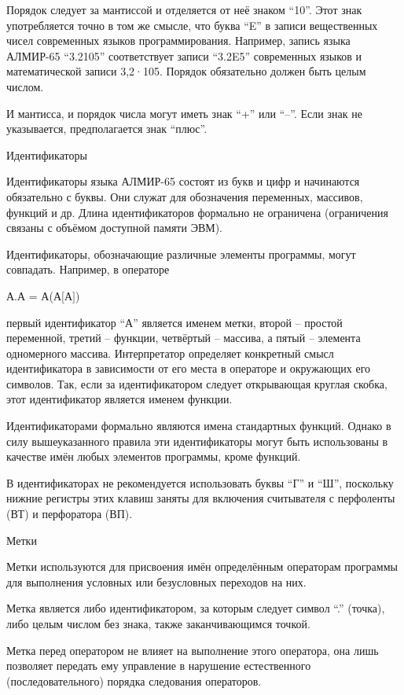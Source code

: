 \documentclass[11pt]{article}
\begin{document}
Порядок следует за мантиссой и
отделяется от неё знаком “10”. Этот
знак употребляется точно в том же
смысле, что буква “E” в записи
вещественных чисел современных языков
программирования. Например, запись
языка АЛМИР-65 “3.2105” соответствует
записи “3.2E5” современных языков и
математической записи 3,2·105. Порядок
обязательно должен быть целым числом.

И мантисса, и порядок числа могут иметь
знак “+” или “–”. Если знак не
указывается, предполагается знак
“плюс”.

Идентификаторы

Идентификаторы языка АЛМИР-65 состоят
из букв и цифр и начинаются обязательно
с буквы. Они служат для обозначения
переменных, массивов, функций и др.
Длина идентификаторов формально не
ограничена (ограничения связаны с
объёмом доступной памяти ЭВМ).

Идентификаторы, обозначающие
различные элементы программы, могут
совпадать. Например, в операторе

А.А = А(А$[$А$]$)

первый идентификатор “А” является
именем метки, второй – простой
переменной, третий – функции,
четвёртый – массива, а пятый –
элемента одномерного массива.
Интерпретатор определяет конкретный
смысл идентификатора в зависимости от
его места в операторе и окружающих его
символов. Так, если за идентификатором
следует открывающая круглая скобка,
этот идентификатор является именем
функции.

Идентификаторами формально являются
имена стандартных функций. Однако в
силу вышеуказанного правила эти
идентификаторы могут быть
использованы в качестве имён любых
элементов программы, кроме функций.

В идентификаторах не рекомендуется
использовать буквы “Г” и “Ш”,
поскольку нижние регистры этих клавиш
заняты для включения считывателя с
перфоленты (ВТ) и перфоратора (ВП).

Метки

Метки используются для присвоения имён
определённым операторам программы для
выполнения условных или безусловных
переходов на них.

Метка является либо идентификатором,
за которым следует символ “.” (точка),
либо целым числом без знака, также
заканчивающимся точкой.

Метка перед оператором не влияет на
выполнение этого оператора, она лишь
позволяет передать ему управление в
нарушение естественного
(последовательного) порядка следования
операторов.
\end{document}
